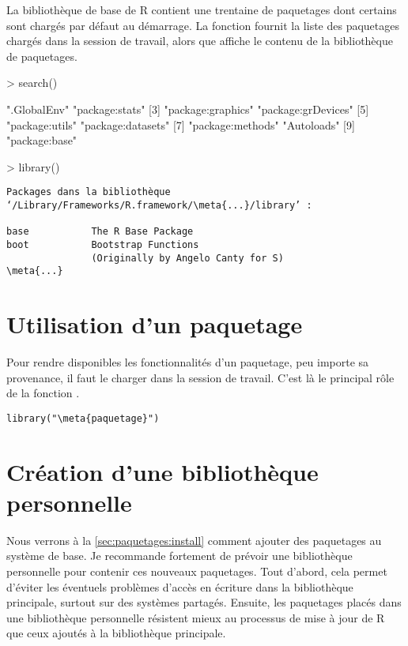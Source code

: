 La bibliothèque de base de R contient une trentaine de paquetages dont
certains sont chargés par défaut au démarrage. La fonction
 fournit la liste des paquetages chargés dans la session
de travail, alors que  affiche le contenu de la
bibliothèque de paquetages.
\begin{Schunk}
\begin{Sinput}
> search()
\end{Sinput}
\begin{Soutput}
[1] ".GlobalEnv"        "package:stats"
[3] "package:graphics"  "package:grDevices"
[5] "package:utils"     "package:datasets"
[7] "package:methods"   "Autoloads"
[9] "package:base"
\end{Soutput}
\begin{Sinput}
> library()
\end{Sinput}
\begin{Verbatim}[commandchars=\\\{\}]
Packages dans la bibliothèque
‘/Library/Frameworks/R.framework/\meta{...}/library’ :

base           The R Base Package
boot           Bootstrap Functions
               (Originally by Angelo Canty for S)
\meta{...}
\end{Verbatim}
\end{Schunk}


\section{Utilisation d'un paquetage}
\label{sec:paquetages:utilisation}

Pour rendre disponibles les fonctionnalités d'un paquetage, peu
importe sa provenance, il faut le charger dans la session de travail.
C'est là le principal rôle de la fonction .
\begin{Schunk}
\begin{Verbatim}[commandchars=\\\{\}]
library("\meta{paquetage}")
\end{Verbatim}
\end{Schunk}


\section{Création d'une bibliothèque personnelle}
\label{sec:paquetages:library}

Nous verrons à la \autoref{sec:paquetages:install} comment ajouter des
paquetages au système de base. Je recommande fortement de prévoir une
bibliothèque personnelle pour contenir ces nouveaux paquetages. Tout
d'abord, cela permet d'éviter les éventuels problèmes d'accès en
écriture dans la bibliothèque principale, surtout sur des systèmes
partagés. Ensuite, les paquetages placés dans une bibliothèque
personnelle résistent mieux au processus de mise à jour de R que ceux
ajoutés à la bibliothèque principale.

